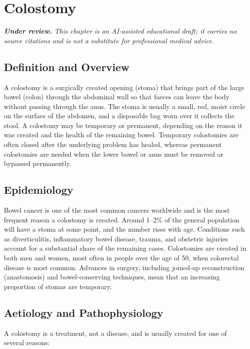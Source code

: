 \chapter{Colostomy}

\medskip
\noindent\textit{\textbf{Under review.} This chapter is an AI-assisted educational draft; it carries no source citations and is not a substitute for professional medical advice.}

\section*{Definition and Overview}
A colostomy is a surgically created opening (stoma) that brings part of the large bowel (colon) through the abdominal wall so that faeces can leave the body without passing through the anus. The stoma is usually a small, red, moist circle on the surface of the abdomen, and a disposable bag worn over it collects the stool. A colostomy may be temporary or permanent, depending on the reason it was created and the health of the remaining bowel. Temporary colostomies are often closed after the underlying problem has healed, whereas permanent colostomies are needed when the lower bowel or anus must be removed or bypassed permanently.

\section*{Epidemiology}
Bowel cancer is one of the most common cancers worldwide and is the most frequent reason a colostomy is created. Around 1--2\% of the general population will have a stoma at some point, and the number rises with age. Conditions such as diverticulitis, inflammatory bowel disease, trauma, and obstetric injuries account for a substantial share of the remaining cases. Colostomies are created in both men and women, most often in people over the age of 50, when colorectal disease is most common. Advances in surgery, including joined-up reconstruction (anastomosis) and bowel-conserving techniques, mean that an increasing proportion of stomas are temporary.

\section*{Aetiology and Pathophysiology}
A colostomy is a treatment, not a disease, and is usually created for one of several reasons:

